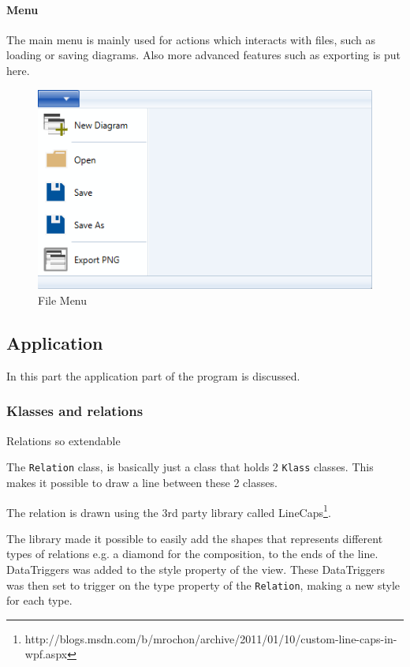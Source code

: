 \paragraph{Menu}
The main menu is mainly used for actions which interacts with files, such as
loading or saving diagrams. Also more advanced features such as exporting is put
here.

\begin{figure}[H]
\centering
\includegraphics[width=\linewidth]{"img/file menu"}
\caption{File Menu \label{menu}}
\end{figure}

\subsection{Application}
In this part the application part of the program is discussed.

\subsubsection{Klasses and relations}
Relations so extendable

The \texttt{Relation} class, is basically just a class that holds 2
\texttt{Klass} classes. This makes it possible to draw a line between these 2
classes.

The relation is drawn using the 3rd party library called
LineCaps\footnote{http://blogs.msdn.com/b/mrochon/archive/2011/01/10/custom-line-caps-in-wpf.aspx}.

The library made it possible to easily add the shapes that represents different
types of relations e.g. a diamond for the composition, to the ends of the line.
DataTriggers was added to the style property of the view. These DataTriggers was
then set to trigger on the type property of the \texttt{Relation}, making a new
style for each type.

